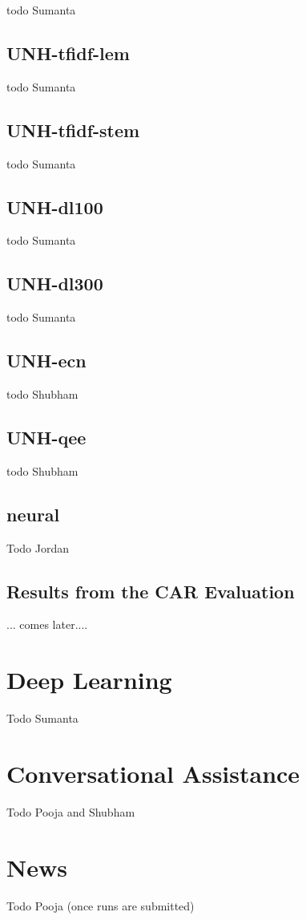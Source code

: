 \documentclass{article}
\begin{document}
todo Sumanta 


\subsection{UNH-tfidf-lem}
todo Sumanta 

\subsection{UNH-tfidf-stem}
todo Sumanta 


\subsection{UNH-dl100}

todo Sumanta 

\subsection{UNH-dl300}
todo Sumanta 

\subsection{UNH-ecn}
todo Shubham 

\subsection{UNH-qee}
todo Shubham


\subsection{neural}

Todo Jordan


\subsection {Results from the CAR Evaluation}

... comes later....

\section{Deep Learning}

Todo Sumanta


\section{Conversational Assistance}

Todo Pooja and Shubham

\section{News}

Todo Pooja  (once runs are submitted)
\end{document}
